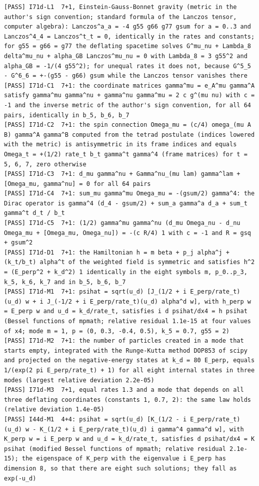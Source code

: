 \documentclass[
  10pt,
]{article}
\begin{document}
\begin{verbatim}
[PASS] I71d-L1  7+1, Einstein-Gauss-Bonnet gravity (metric in the author's sign convention; standard formula of the Lanczos tensor, computer algebra): Lanczos^a_a = -4 g55 g66 g77 gsum for a = 0..3 and Lanczos^4_4 = Lanczos^t_t = 0, identically in the rates and constants; for g55 = g66 = g77 the deflating spacetime solves G^mu_nu + Lambda_8 delta^mu_nu + alpha_GB Lanczos^mu_nu = 0 with Lambda_8 = 3 g55^2 and alpha_GB = -1/(4 g55^2); for unequal rates it does not, because G^5_5 - G^6_6 = +-(g55 - g66) gsum while the Lanczos tensor vanishes there
[PASS] I71d-C1  7+1: the coordinate matrices gamma^mu = e_A^mu gamma^A satisfy gamma^mu gamma^nu + gamma^nu gamma^mu = 2 c g^(mu nu) with c = -1 and the inverse metric of the author's sign convention, for all 64 pairs, identically in b_5, b_6, b_7
[PASS] I71d-C2  7+1: the spin connection Omega_mu = (c/4) omega_(mu A B) gamma^A gamma^B computed from the tetrad postulate (indices lowered with the metric) is antisymmetric in its frame indices and equals Omega_t = +(1/2) rate_t b_t gamma^t gamma^4 (frame matrices) for t = 5, 6, 7, zero otherwise
[PASS] I71d-C3  7+1: d_mu gamma^nu + Gamma^nu_(mu lam) gamma^lam + [Omega_mu, gamma^nu] = 0 for all 64 pairs
[PASS] I71d-C4  7+1: sum_mu gamma^mu Omega_mu = -(gsum/2) gamma^4: the Dirac operator is gamma^4 (d_4 - gsum/2) + sum_a gamma^a d_a + sum_t gamma^t d_t / b_t
[PASS] I71d-C5  7+1: (1/2) gamma^mu gamma^nu (d_mu Omega_nu - d_nu Omega_mu + [Omega_mu, Omega_nu]) = -(c R/4) 1 with c = -1 and R = gsq + gsum^2
[PASS] I71d-D1  7+1: the Hamiltonian h = m beta + p_j alpha^j + (k_t/b_t) alpha^t of the weighted field is symmetric and satisfies h^2 = (E_perp^2 + k_d^2) 1 identically in the eight symbols m, p_0..p_3, k_5, k_6, k_7 and in b_5, b_6, b_7
[PASS] I71d-M1  7+1: psihat = sqrt(u_d) [J_(1/2 + i E_perp/rate_t)(u_d) w + i J_(-1/2 + i E_perp/rate_t)(u_d) alpha^d w], with h_perp w = E_perp w and u_d = k_d/rate_t, satisfies i d psihat/dx4 = h psihat (Bessel functions of mpmath; relative residual 1.1e-15 at four values of x4; mode m = 1, p = (0, 0.3, -0.4, 0.5), k_5 = 0.7, g55 = 2)
[PASS] I71d-M2  7+1: the number of particles created in a mode that starts empty, integrated with the Runge-Kutta method DOP853 of scipy and projected on the negative-energy states at k_d = 80 E_perp, equals 1/(exp(2 pi E_perp/rate_t) + 1) for all eight internal states in three modes (largest relative deviation 2.2e-05)
[PASS] I71d-M3  7+1, equal rates 1.3 and a mode that depends on all three deflating coordinates (constants 1, 0.7, 2): the same law holds (relative deviation 1.4e-05)
[PASS] I44d-M1  4+4: psihat = sqrt(u_d) [K_(1/2 - i E_perp/rate_t)(u_d) w - K_(1/2 + i E_perp/rate_t)(u_d) i gamma^4 gamma^d w], with K_perp w = i E_perp w and u_d = k_d/rate_t, satisfies d psihat/dx4 = K psihat (modified Bessel functions of mpmath; relative residual 2.1e-15); the eigenspace of K_perp with the eigenvalue i E_perp has dimension 8, so that there are eight such solutions; they fall as exp(-u_d)

\end{verbatim}
\end{document}
